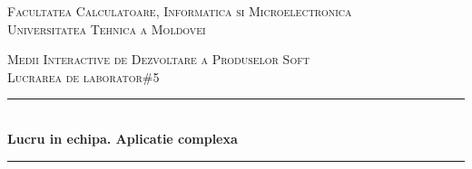 \begin{center} %
	
	
	
	
	
	
	\textsc{\large Facultatea Calculatoare, Informatica si Microelectronica}\\[0.5cm]
	
	\textsc{\large Universitatea Tehnica a Moldovei}\\[1.2cm] %
	
	\vspace{25 mm}
	
	
	
	\textsc{\Large Medii Interactive de Dezvoltare a Produselor Soft}\\[0.5cm] %
	
	\textsc{\large Lucrarea de laborator\#5}\\[0.5cm] %
	
	
	
	
	\newcommand{\HRule}{\rule{\linewidth}{0.5mm}} %
	
	
	
	
	
	
	\vspace{10 mm}
	
	\HRule \\[0.4cm]
	
	{ \LARGE \bfseries Lucru in echipa. Aplicatie complexa  }\\[0.4cm] %
	
	\HRule \\[1.5cm]
	
	
	

\end{center}

